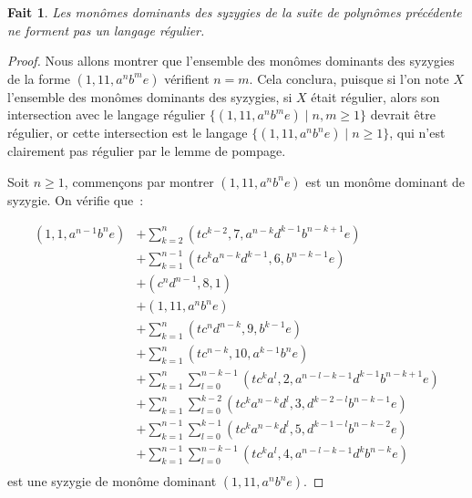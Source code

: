 \documentclass{article}
\newtheorem*{fact}{Fait}
\begin{document}
\begin{fact}
	Les monômes dominants des syzygies de la suite de polynômes précédente ne forment pas un langage régulier.
\end{fact}
\begin{proof}
Nous allons montrer que l'ensemble des monômes dominants des syzygies de la forme $(1, 11, a^nb^me)$ vérifient $n = m$. Cela conclura, puisque si l'on note $X$ l'ensemble des monômes dominants des syzygies, si $X$ était régulier, alors son intersection avec le langage régulier $\{(1, 11, a^nb^me) \;|\; n, m \geq 1\}$ devrait être régulier, or cette intersection est le langage $\{(1, 11, a^nb^ne) \;|\; n \geq 1 \}$, qui n'est clairement pas régulier par le lemme de pompage.

Soit $n \geq 1$, commençons par montrer $(1, 11, a^nb^ne)$ est un monôme dominant de syzygie.
On vérifie que~:

\begin{align*}
(1, 1, a^{n-1}b^ne) & + \sum_{k = 2}^{n} (tc^{k - 2}, 7, a^{n - k}d^{k - 1}b^{n - k + 1}e) \\
& + \sum_{k = 1}^{n - 1} (tc^ka^{n - k}d^{k - 1}, 6, b^{n - k - 1}e) \\
& + (c^nd^{n - 1}, 8, 1) \\
& + (1, 11, a^nb^ne) \\
& + \sum_{k = 1}^n (tc^nd^{n - k}, 9, b^{k - 1}e) \\
& + \sum_{k = 1}^n (tc^{n - k}, 10, a^{k - 1}b^ne) \\
& + \sum_{k = 1}^{n} \sum_{l = 0}^{n - k - 1} (tc^{k}a^{l}, 2, a^{n - l - k - 1}d^{k - 1}b^{n - k + 1} e) \\
& + \sum_{k = 1}^{n} \sum_{l = 0}^{k - 2} (tc^{k}a^{n - k}d^l, 3, d^{k - 2 - l}b^{n - k - 1}e) \\
& + \sum_{k = 1}^{n - 1} \sum_{l = 0}^{k - 1} (tc^{k}a^{n - k}d^l, 5, d^{k - 1 - l}b^{n - k - 2}e) \\
& + \sum_{k = 1}^{n - 1} \sum_{l = 0}^{n - k - 1} (tc^{k}a^{l}, 4, a^{n - l - k - 1}d^{k}b^{n - k} e) \\
\end{align*}
est une syzygie de monôme dominant $(1, 11, a^nb^ne)$.


\end{proof}
\end{document}
